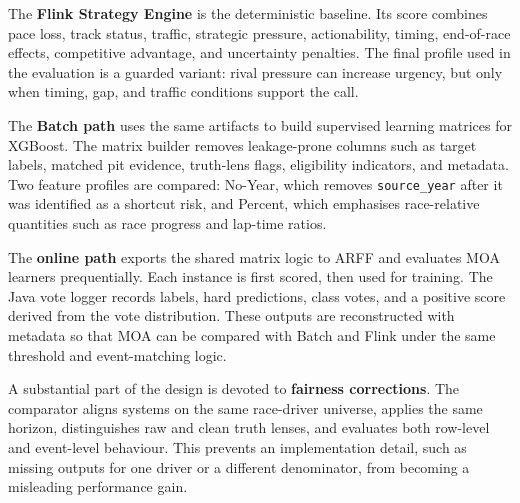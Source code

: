 The \textbf{Flink Strategy Engine} is the deterministic baseline. Its score combines pace loss, track status, traffic, strategic pressure, 
actionability, timing, end-of-race effects, competitive advantage, and uncertainty penalties. The final profile used in the evaluation is a 
guarded variant: rival pressure can increase urgency, but only when timing, gap, and traffic conditions support the call.

The \textbf{Batch path} uses the same artifacts to build supervised learning matrices for XGBoost. The matrix builder removes leakage-prone 
columns such as target labels, matched pit evidence, truth-lens flags, eligibility indicators, and metadata. Two feature profiles are compared: 
No-Year, which removes \texttt{source\_year} after it was identified as a shortcut risk, and Percent, which emphasises race-relative quantities 
such as race progress and lap-time ratios.

The \textbf{online path} exports the shared matrix logic to ARFF and evaluates MOA learners prequentially. Each instance is first scored, then used 
for training. The Java vote logger records labels, hard predictions, class votes, and a positive score derived from the vote distribution. These 
outputs are reconstructed with metadata so that MOA can be compared with Batch and Flink under the same threshold and event-matching logic.

A substantial part of the design is devoted to \textbf{fairness corrections}. The comparator aligns systems on the same race-driver universe, applies 
the same horizon, distinguishes raw and clean truth lenses, and evaluates both row-level and event-level behaviour. This prevents an implementation 
detail, such as missing outputs for one driver or a different denominator, from becoming a misleading performance gain.
